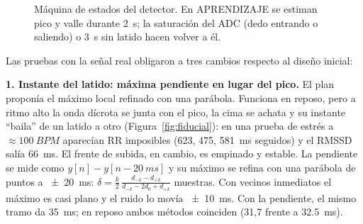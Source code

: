 \documentclass[11pt,a4paper]{article}
\begin{document}
\begin{figure}[H]
\centering
{}
\caption{Máquina de estados del detector. En APRENDIZAJE se estiman pico y valle durante
\qty{2}{s}; la saturación del ADC (dedo entrando o saliendo) o \qty{3}{s} sin latido hacen
volver a él.}
\label{fig:fsm}
\end{figure}

Las pruebas con la señal real obligaron a tres cambios respecto al diseño inicial:

\textbf{1. Instante del latido: máxima pendiente en lugar del pico.} El plan proponía el
máximo local refinado con una parábola. Funciona en reposo, pero a ritmo alto la onda dícrota
se junta con el pico, la cima se achata y su instante ``baila'' de un latido a otro
(Figura~\ref{fig:fiducial}): en una prueba de estrés a $\approx\qty{100}{BPM}$ aparecían RR
imposibles (623, 475, \qty{581}{ms} seguidos) y el RMSSD salía \qty{66}{ms}. El frente de
subida, en cambio, es empinado y estable. La pendiente se mide como
$y[n] - y[n - \qty{20}{ms}]$ y su máximo se refina con una parábola de puntos a
\qty{\pm 20}{ms}:
$\delta = \frac{k}{2}\,\frac{d_{-k} - d_{+k}}{d_{-k} - 2d_0 + d_{+k}}$ muestras. Con vecinos
inmediatos el máximo es casi plano y el ruido lo movía \qty{\pm 10}{ms}. Con la pendiente, el
mismo tramo da \qty{35}{ms}; en reposo ambos métodos coinciden (31,7 frente a
\qty{32.5}{ms}).
\end{document}
